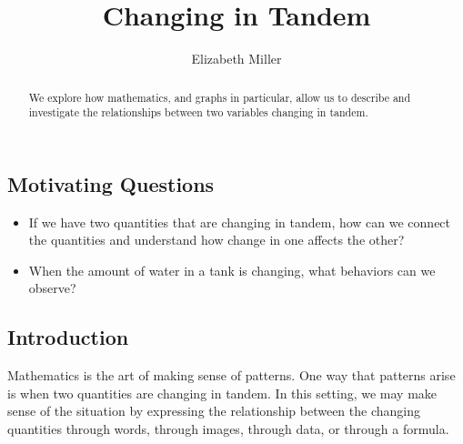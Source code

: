 \documentclass{ximera}
\author{Elizabeth Miller}
\title{Changing in Tandem}
\begin{document}
\begin{abstract}
  We explore how mathematics, and graphs in particular, allow us to describe and investigate the relationships between two variables changing in tandem.
\end{abstract}
\maketitle


\begin{tcolorbox}
\subsection{Motivating Questions}
%
\begin{itemize}[label=\textbullet]
\item{}\hypertarget{p-24}{}%
If we have two quantities that are changing in tandem, how can we connect the quantities and understand how change in one affects the other?%
\item{}\hypertarget{p-25}{}%
When the amount of water in a tank is changing, what behaviors can we observe?%
\end{itemize}
\end{tcolorbox}



\subsection{Introduction}
Mathematics is the art of making sense of patterns.  One way that patterns arise is when two quantities are changing in tandem.  In this setting, we may make sense of the situation by expressing the relationship between the changing quantities through words, through images, through data, or through a formula.%
\end{document}
